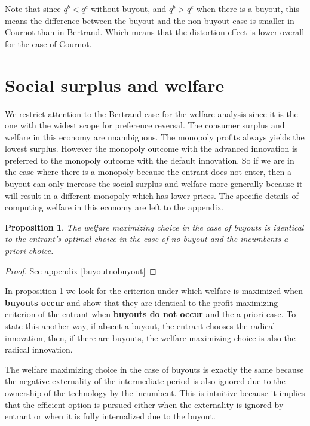 \documentclass[11pt]{article}
\newtheorem{proposition}{Proposition}
\begin{document}
Note that since $q^b<q^c$ without buyout, and $q^b>q^c$ when there is a buyout, this means the difference between the buyout and the non-buyout case is smaller in Cournot than in Bertrand. Which means that the distortion effect is lower overall for the case of Cournot. 

\section*{ Social surplus and welfare}

We restrict attention to the Bertrand case for the welfare analysis since it is the one with the widest scope for preference reversal. The consumer surplus and welfare in this economy are unambiguous. The monopoly profits always yields the lowest surplus. However the monopoly outcome with the advanced innovation is preferred to the monopoly outcome with the default innovation. So if we are in the case where there is a monopoly because the entrant does not enter, then a buyout can only increase the social surplus and welfare more generally because it will result in a different monopoly which has lower prices. The specific details of computing welfare in this economy are left to the appendix. 

\begin{proposition}\label{propwelfare}
The welfare maximizing choice in the case of buyouts is identical to the entrant's optimal choice in the case of no buyout and the incumbents a priori choice. 
\end{proposition}

\begin{proof}
See appendix \ref{buyoutnobuyout}
\end{proof}

In proposition \ref{propwelfare} we look for the criterion under which welfare is maximized when \textbf{ buyouts occur} and show that they are identical to the profit maximizing criterion of the entrant when \textbf{buyouts do not occur} and the a priori case. To state this another way, if absent a buyout, the entrant chooses the radical innovation, then, if there are buyouts, the welfare maximizing choice is also the radical innovation. 

The welfare maximizing choice in the case of buyouts is exactly the same because the negative externality of the intermediate period is also ignored due to the ownership of the technology by the incumbent. This is intuitive because it implies that the efficient option is pursued either when the externality is ignored by entrant or when it is fully internalized due to the buyout.
\end{document}
